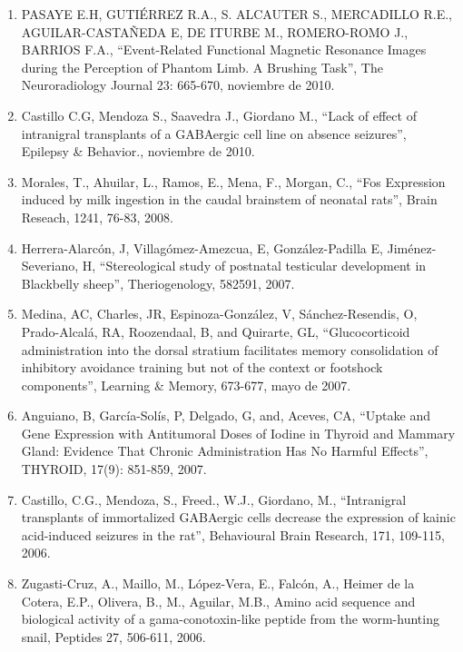 \begin{enumerate}
\item PASAYE E.H, GUTIÉRREZ R.A., S. ALCAUTER S., MERCADILLO R.E., AGUILAR-CASTAÑEDA E, DE ITURBE M., ROMERO-ROMO J., BARRIOS F.A., 
“Event-Related 
Functional Magnetic Resonance Images during the Perception of Phantom Limb. A Brushing Task”, The Neuroradiology Journal 23: 665-670, 
noviembre de 2010.

\item Castillo C.G, Mendoza S., Saavedra J., Giordano M., “Lack of effect of intranigral transplants of a GABAergic cell line on absence 
seizures”, 
Epilepsy \& Behavior., noviembre de 2010.

\item Morales, T., Ahuilar, L., Ramos, E., Mena, F., Morgan, C., “Fos Expression induced by milk ingestion in the caudal brainstem of 
neonatal 
rats”, Brain Reseach, 1241, 76-83, 2008.

\item Herrera-Alarcón, J, Villagómez-Amezcua, E, González-Padilla E, Jiménez-Severiano, H, “Stereological study of postnatal testicular 
development 
in Blackbelly sheep”, Theriogenology, 582591, 2007.

\item Medina, AC, Charles, JR, Espinoza-González, V, Sánchez-Resendis, O, Prado-Alcalá, RA, Roozendaal, B, and Quirarte, GL, “Glucocorticoid 
administration into the dorsal stratium facilitates memory consolidation of inhibitory avoidance training but not of the context or footshock 
components”, Learning \& Memory, 673-677, mayo de 2007.

\item Anguiano, B, García-Solís, P, Delgado, G, and, Aceves, CA, “Uptake and Gene Expression with Antitumoral Doses of Iodine in Thyroid and 
Mammary Gland: Evidence That Chronic Administration Has No Harmful Effects”, THYROID, 17(9): 851-859, 2007.

\item Castillo, C.G., Mendoza, S., Freed., W.J., Giordano, M., “Intranigral transplants of immortalized GABAergic cells decrease the 
expression of 
kainic acid-induced seizures in the rat”, Behavioural Brain Research, 171, 109-115, 2006.

\item Zugasti-Cruz, A., Maillo, M., López-Vera, E., Falcón, A., Heimer de la Cotera, E.P., Olivera, B., M., Aguilar, M.B., Amino acid 
sequence and 
biological activity of a gama-conotoxin-like peptide from the worm-hunting snail, Peptides 27, 506-611, 2006.


\end{enumerate}
